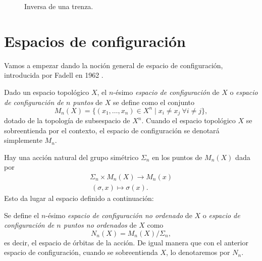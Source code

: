 \documentclass[TFG.tex]{subfiles}
\begin{document}

\begin{figure}[h!]
\caption{Inversa de una trenza.}\label{especular}
\end{figure}


\section{Espacios de configuración}
Vamos a empezar dando la noción general de espacio de configuración, introducida por Fadell en 1962 \cite{Fadell}.
\begin{defi}
Dado un espacio topológico $X$, el $n$-ésimo \emph{espacio de configuración} de $X$ o \emph{espacio de configuración de $n$ puntos} de $X$ se define como el conjunto
$$M_n(X)=\{(x_1,\dots,x_n)\in X^n\mid x_i\neq x_j\ \forall i\neq j\},$$
dotado de la topología de subsespacio de $X^n$. Cuando el espacio topológico $X$ se sobreentienda por el contexto, el espacio de configuración se denotará simplemente $M_n$. 
\end{defi}

Hay una acción natural del grupo simétrico $\Sigma_n$ en los puntos de $M_n(X)$ dada por 
\begin{gather*}
\Sigma_n\times M_n(X)\to M_n(x)\\
\ (\sigma,x)\mapsto \sigma(x).
\end{gather*}
Esto da lugar al espacio definido a continuación:
\begin{defi}
Se define el $n$-ésimo \emph{espacio de configuración no ordenado} de $X$ o \emph{espacio de configuración de $n$ puntos no ordenados} de $X$ como 
$$N_n(X)=M_n(X)/\Sigma_n,$$
es decir, el espacio de órbitas de la acción. De igual manera que con el anterior espacio de configuración, cuando se sobreentienda $X$, lo denotaremos por $N_n$. 
\end{defi}
\end{document}
